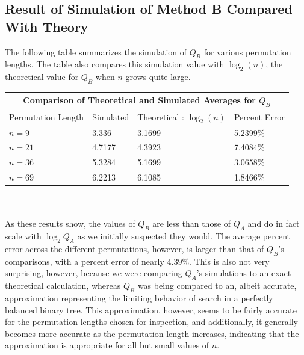 \documentclass[11pt, oneside]{article}   	%
\begin{document}
\subsection{Result of Simulation of Method B Compared With Theory}
The following table summarizes the simulation of $Q_B$ for various permutation lengths. The table also compares this simulation value with $\log_2(n)$, the theoretical value for $Q_B$ when $n$ grows quite large.\\

\begin{tabular}{| m{3.5cm} || m{3.5cm} | m{3.5cm} | m{3.5cm} |}
\hline
\multicolumn{4}{|c|}{Comparison of Theoretical and Simulated Averages for $Q_B$}\\
\hline\hline
Permutation Length & Simulated & Theoretical : $\log_2(n)$ & Percent Error \\
\hline
$n=9$  & 3.336  & 3.1699 & 5.2399\% \\
$n=21$ & 4.7177 & 4.3923 & 7.4084\% \\
$n=36$ & 5.3284 & 5.1699 & 3.0658\% \\
$n=69$ & 6.2213 & 6.1085 & 1.8466\% \\
\hline
\end{tabular}\\ \\
As these results show, the values of $Q_B$ are less than those of $Q_A$ and do in fact scale with $\log_2{Q_A}$ as we initially suspected they would. The average percent error across the different permutations, however, is larger than that of $Q_B$'s comparisons, with a percent error of nearly $4.39\%$. This is also not very surprising, however, because we were comparing $Q_A$'s simulations to an exact theoretical calculation, whereas $Q_B$ was being compared to an, albeit accurate, approximation representing the limiting behavior of search in a perfectly balanced binary tree. This approximation, however, seems to be fairly accurate for the permutation lengths chosen for inspection, and additionally, it generally becomes more accurate as the permutation length increases, indicating that the approximation is appropriate for all but small values of $n$.
\end{document}
